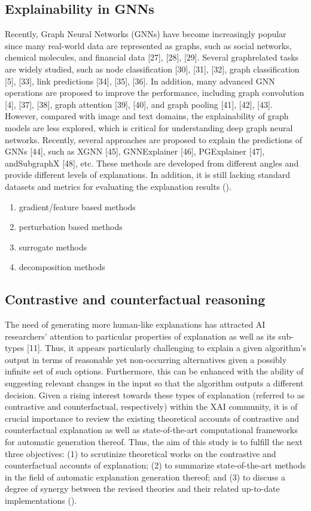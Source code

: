 \documentclass[binding=0.6cm]{sapthesis}
\newcommand{\mycite}[1]{(\cite{#1})}
\begin{document}
\subsection{Explainability in GNNs}
\label{sec:bg.xai.gnn-xai}
Recently, Graph Neural Networks (GNNs) have become increasingly popular since many real-world data are represented as graphs, such as social networks, chemical molecules, and financial data [27], [28], [29]. Several graphrelated tasks are widely studied, such as node classification [30], [31], [32], graph classification [5], [33], link predictions [34], [35], [36]. In addition, many advanced GNN operations are proposed to improve the performance, including graph convolution [4], [37], [38], graph attention [39], [40], and graph pooling [41], [42], [43]. However, compared with image and text domains, the explainability of graph models are less explored, which is critical for understanding deep graph neural networks. Recently, several approaches are proposed to explain the predictions of GNNs [44], such as XGNN [45], GNNExplainer [46], PGExplainer [47], andSubgraphX [48], etc. These methods are developed from different angles and provide different levels of explanations. In addition, it is still lacking standard datasets and metrics for evaluating the explanation results \mycite{yuan2022-xai-gnn-survey}.

\begin{enumerate}
    \item gradient/feature based methods
    \item perturbation based methods
    \item surrogate methods
    \item decomposition methods
\end{enumerate}


\subsection{Contrastive and counterfactual reasoning}
\label{sec:bg.xai.cf-reason}
The need of generating more human-like explanations has attracted AI researchers’ attention to particular properties of explanation as well as its sub-types [11]. Thus, it appears particularly challenging to explain a given algorithm’s output in terms of reasonable yet non-occurring alternatives given a possibly infinite set of such options. Furthermore, this can be enhanced with the ability of suggesting relevant changes in the input so that the algorithm outputs a different decision. Given a rising interest towards these types of explanation (referred to as contrastive and counterfactual, respectively) within the XAI community, it is of crucial importance to review the existing theoretical accounts of contrastive and counterfactual explanation as well as state-of-the-art computational frameworks for automatic generation thereof. Thus, the aim of this study is to fulfill the next three objectives: (1) to scrutinize theoretical works on the contrastive and counterfactual accounts of explanation; (2) to summarize state-of-the-art methods in the field of automatic explanation generation thereof; and (3) to discuss a degree of synergy between the revised theories and their related up-to-date implementations \mycite{stepin2021-xai-cf-contrative-survey}.
\end{document}
